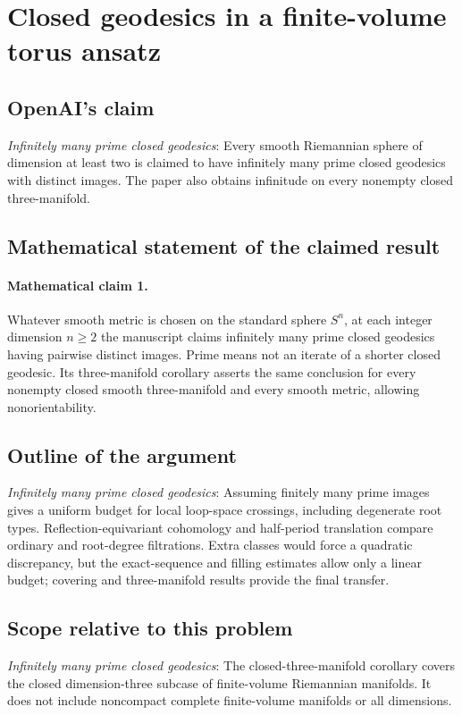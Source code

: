 \documentclass[11pt]{article}
\begin{document}
\section*{Closed geodesics in a finite-volume torus ansatz}

\subsection{OpenAI's claim}
\textit{Infinitely many prime closed geodesics}: Every smooth Riemannian sphere of dimension at least two is claimed to have infinitely many prime closed geodesics with distinct images. The paper also obtains infinitude on every nonempty closed three-manifold.

\subsection{Mathematical statement of the claimed result}
\paragraph{Mathematical claim 1.} Whatever smooth metric is chosen on the standard sphere $S^n$, at each integer dimension $n\ge2$ the manuscript claims infinitely many prime closed geodesics having pairwise distinct images. Prime means not an iterate of a shorter closed geodesic. Its three-manifold corollary asserts the same conclusion for every nonempty closed smooth three-manifold and every smooth metric, allowing nonorientability.

\subsection{Outline of the argument}
\textit{Infinitely many prime closed geodesics}: Assuming finitely many prime images gives a uniform budget for local loop-space crossings, including degenerate root types. Reflection-equivariant cohomology and half-period translation compare ordinary and root-degree filtrations. Extra classes would force a quadratic discrepancy, but the exact-sequence and filling estimates allow only a linear budget; covering and three-manifold results provide the final transfer.

\subsection{Scope relative to this problem}
\textit{Infinitely many prime closed geodesics}: The closed-three-manifold corollary covers the closed dimension-three subcase of finite-volume Riemannian manifolds. It does not include noncompact complete finite-volume manifolds or all dimensions.
\end{document}
